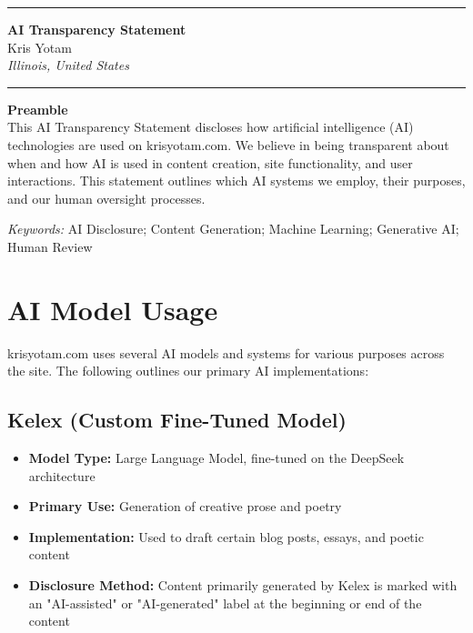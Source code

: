 \documentclass[11pt]{article}
\newcommand{\TitleLine}{\noindent\rule{\textwidth}{0.4pt}}
\begin{document}
\onehalfspacing

\vspace*{-1em}
\TitleLine
\vspace{0.5em}
\begin{center}
  {\Large\bfseries AI Transparency Statement}\\[0.75em]
  {\normalsize Kris Yotam}\\
  {\itshape Illinois, United States}
\end{center}
\vspace{0.5em}
\TitleLine

\vspace{1.5em}

\noindent\textbf{Preamble}\\
This AI Transparency Statement discloses how artificial intelligence (AI) technologies are used on krisyotam.com. We believe in being transparent about when and how AI is used in content creation, site functionality, and user interactions. This statement outlines which AI systems we employ, their purposes, and our human oversight processes.

\vspace{0.75em}
\noindent\textit{Keywords:} AI Disclosure; Content Generation; Machine Learning; Generative AI; Human Review

\vspace{1.5em}

\section{AI Model Usage}
krisyotam.com uses several AI models and systems for various purposes across the site. The following outlines our primary AI implementations:

\subsection{Kelex (Custom Fine-Tuned Model)}
\begin{itemize}
  \item \textbf{Model Type:} Large Language Model, fine-tuned on the DeepSeek architecture
  \item \textbf{Primary Use:} Generation of creative prose and poetry
  \item \textbf{Implementation:} Used to draft certain blog posts, essays, and poetic content
  \item \textbf{Disclosure Method:} Content primarily generated by Kelex is marked with an "AI-assisted" or "AI-generated" label at the beginning or end of the content
\end{itemize}
\end{document}

